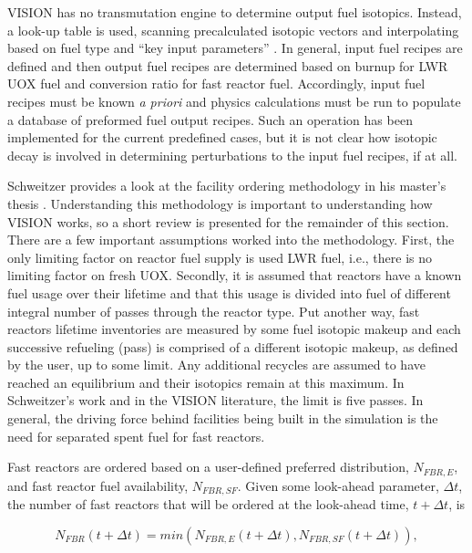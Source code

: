 VISION has no transmutation engine to determine output fuel isotopics. Instead,
a look-up table is used, scanning precalculated isotopic vectors and
interpolating based on fuel type and ``key input parameters''
\cite{jacobson_verifiable_2010}. In general, input fuel recipes are defined and
then output fuel recipes are determined based on burnup for LWR UOX fuel and
conversion ratio for fast reactor fuel. Accordingly, input fuel recipes must be
known \textit{a priori} and physics calculations must be run to populate a
database of preformed fuel output recipes. Such an operation has been
implemented for the current predefined cases, but it is not clear how isotopic
decay is involved in determining perturbations to the input fuel recipes, if at
all.

Schweitzer provides a look at the facility ordering methodology in his master's
thesis \cite{schweitzer_improved_2008}. Understanding this methodology is
important to understanding how VISION works, so a short review is presented for
the remainder of this section. There are a few important assumptions worked into
the methodology. First, the only limiting factor on reactor fuel supply is used
LWR fuel, i.e., there is no limiting factor on fresh UOX. Secondly, it is
assumed that reactors have a known fuel usage over their lifetime and that this
usage is divided into fuel of different integral number of passes through the
reactor type. Put another way, fast reactors lifetime inventories are measured
by some fuel isotopic makeup and each successive refueling (pass) is comprised
of a different isotopic makeup, as defined by the user, up to some limit. Any
additional recycles are assumed to have reached an equilibrium and their
isotopics remain at this maximum. In Schweitzer's work and in the VISION
literature, the limit is five passes. In general, the driving force behind
facilities being built in the simulation is the need for separated spent fuel
for fast reactors.

Fast reactors are ordered based on a user-defined preferred distribution,
$N_{FBR,E}$, and fast reactor fuel availability, $N_{FBR,SF}$. Given some
look-ahead parameter, $\Delta t$, the number of fast reactors that will be
ordered at the look-ahead time, $t + \Delta t$, is

\begin{equation}
N_{FBR}\left(t+\Delta t\right) = min \left( N_{FBR,E}\left(t+\Delta t\right), N_{FBR,SF}\left(t+\Delta t\right)\right),
\end{equation}

